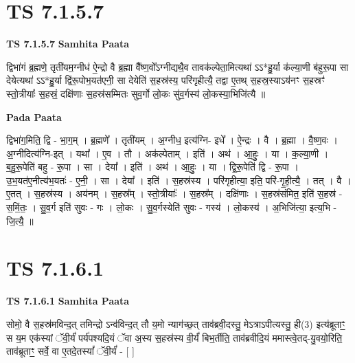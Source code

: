 \documentclass[17pt]{extarticle}
\begin{document}
\section*{ TS 7.1.5.7 }

\textbf{TS 7.1.5.7 } \newline
\textbf{Samhita Paata} \newline

द्विभा॑गं ब्र॒ह्मणे॒ तृती॑यम॒ग्नीध॑ ऐ॒न्द्रो वै ब्र॒ह्मा वै᳚ष्ण॒वो᳚ऽग्नीद्यथै॒व तावक॑ल्पेता॒मित्यथा॑ ऽऽ*हु॒र्या क॑ल्या॒णी ब॑हुरू॒पा सा देयेत्यथा॑ ऽऽ*हु॒र्या द्वि॑रू॒पोभ॒यत॑एनी॒ सा देयेति॑ स॒हस्र॑स्य॒ परि॑गृहीत्यै॒ तद्वा ए॒तथ् स॒हस्र॒स्याऽय॑नꣳ स॒हस्रꣳ॑ स्तो॒त्रीयाः᳚ स॒हस्रं॒ दक्षि॑णाः स॒हस्र॑सम्मितः सुव॒र्गो लो॒कः सु॑व॒र्गस्य॑ लो॒कस्या॒भिजि॑त्यै ॥ \newline

\textbf{Pada Paata} \newline

द्विभा॑ग॒मिति॒ द्वि - भा॒ग॒म् । ब्र॒ह्मणे᳚ । तृती॑यम् । अ॒ग्नीध॒ इत्य॑ग्नि- इधे᳚ । ऐ॒न्द्रः । वै । ब्र॒ह्मा । वै॒ष्ण॒वः । अ॒ग्नीदित्य॑ग्नि-इत् । यथा᳚ । ए॒व । तौ । अक॑ल्पेताम् । इति॑ । अथ॑ । आ॒हुः॒ । या । क॒ल्या॒णी । ब॒हु॒रू॒पेति॑ बहु - रू॒पा । सा । देया᳚ । इति॑ । अथ॑ । आ॒हुः॒ । या । द्वि॒रू॒पेति॑ द्वि - रू॒पा । उ॒भ॒यत॑ए॒नीत्य॑भ॒यतः॑ - ए॒नी॒ । सा । देया᳚ । इति॑ । स॒हस्र॑स्य । परि॑गृहीत्या॒ इति॒ परि॑-गृ॒ही॒त्यै॒ । तत् । वै । ए॒तत् । स॒हस्र॑स्य । अय॑नम् । स॒हस्र᳚म् । स्तो॒त्रीयाः᳚ । स॒हस्र᳚म् । दक्षि॑णाः । स॒हस्र॑संमित॒ इति॑ स॒हस्र॑ - स॒मिं॒तः॒ । सु॒व॒र्ग इति॑ सुवः - गः । लो॒कः । सु॒व॒र्गस्येति॑ सुवः - गस्य॑ । लो॒कस्य॑ । अ॒भिजि॑त्या॒ इत्य॒भि - जि॒त्यै॒ ॥  \newline




\section*{ TS 7.1.6.1 }

\textbf{TS 7.1.6.1 } \newline
\textbf{Samhita Paata} \newline

सोमो॒ वै स॒हस्र॑मविन्द॒त् तमिन्द्रो ऽन्व॑विन्द॒त् तौ य॒मो न्याग॑च्छ॒त् ताव॑ब्रवी॒दस्तु॒ मेऽत्राऽपीत्यस्तु॒ ही(3) इत्य॑ब्रूताꣳ॒॒ स य॒म एक॑स्यां ॅवी॒र्यं॑ पर्य॑पश्यदि॒यं ॅवा अ॒स्य स॒हस्र॑स्य वी॒र्यं॑ बिभ॒र्तीति॒ ताव॑ब्रवीदि॒यं ममास्त्वे॒तद्-यु॒वयो॒रिति॒ ताव॑ब्रूताꣳ॒॒ सर्वे॒ वा ए॒तदे॒तस्यां᳚ ॅवी॒र्यं॑ - [  ] \newline
\end{document}

